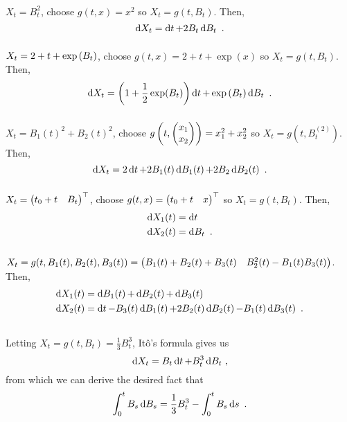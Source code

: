 \documentclass{article}
\begin{document}
  \subsubsection{}
  \(X_t=B_t^2\), choose \(g(t, x)=x^2\) so \(X_t=g(t, B_t)\). Then,
  \[\mathop{\mathrm{d} X_t }=\mathop{\mathrm{d} t }+2B_t\mathop{\mathrm{d} B_t }\,\,.\]

  \subsubsection{}
  \(X_t=2+t+\exp\left({B_t}\right)\), choose \(g(t, x)=2+t+\exp(x)\) so \(X_t=g(t, B_t)\). Then,
  \[\mathop{\mathrm{d} X_t }=\left({1+\frac{1}{2}\exp(B_t)}\right)\mathop{\mathrm{d} t }+\exp\left({B_t}\right)\mathop{\mathrm{d} B_t }\,\,.\]
  \subsubsection{}
  \(X_t=B_1(t)^2+B_2(t)^2\), choose \(g\left({t, \begin{pmatrix} x_1\\x_2 \end{pmatrix}}\right)=x_1^2+x_2^2\) so \(X_t=g(t, B_t^{(2)})\). Then,
  \[\mathop{\mathrm{d} X_t }=2\mathop{\mathrm{d} t }+2B_1(t)\mathop{\mathrm{d} B_1(t) }+2B_2\mathop{\mathrm{d} B_2(t) }\,\,.\]
  \subsubsection{}
  \(X_t=\begin{pmatrix} t_0+t& B_t \end{pmatrix}^\top\), choose \(g(t, x)=\begin{pmatrix} t_0+t&x \end{pmatrix}^\top\) so \(X_t=g(t, B_t)\). Then,
  \begin{align*}
    \mathop{\mathrm{d} X_1(t) }&=\mathop{\mathrm{d} t }\\
    \mathop{\mathrm{d} X_2(t) }&=\mathop{\mathrm{d} B_t }\,\,.
  \end{align*}

  \subsubsection{}
  \(X_t=g(t, B_1(t), B_2(t), B_3(t)) = \begin{pmatrix} B_1(t)+B_2(t)+B_3(t) & B_2^2(t)-B_1(t)B_3(t) \end{pmatrix}\). Then,
  \begin{align*}
    \mathop{\mathrm{d} X_1(t) }&=\mathop{\mathrm{d} B_1(t) }+\mathop{\mathrm{d} B_2(t) }+\mathop{\mathrm{d} B_3(t) }\\
    \mathop{\mathrm{d} X_2(t) }&=\mathop{\mathrm{d} t }-B_3(t)\mathop{\mathrm{d} B_1(t) }+2B_2(t)\mathop{\mathrm{d} B_2(t) }-B_1(t)\mathop{\mathrm{d} B_3(t) }\,\,.
  \end{align*}

  \subsection{}
  Letting \(X_t=g(t, B_t)=\frac{1}{3}B_t^3\), It\^{o}'s formula gives us
  \[
\mathop{\mathrm{d} X_t }=B_t\mathop{\mathrm{d} t }+B_t^3\mathop{\mathrm{d} B_t }\,\,,
\]
from which we can derive the desired fact that
\[
  \int_0^tB_s\mathop{\mathrm{d} B_s }=\frac{1}{3}B_t^3-\int_0^tB_s\mathop{\mathrm{d} s }\,\,.
\]
\end{document}
